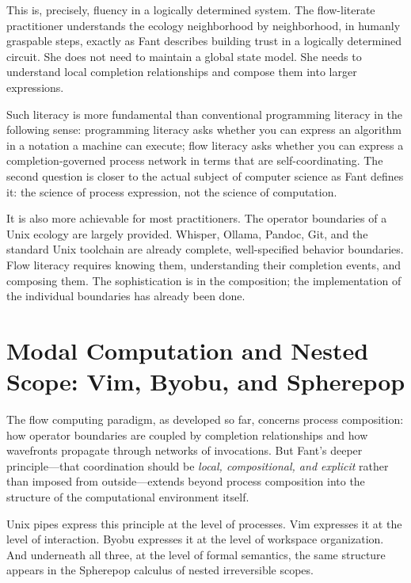 \documentclass[12pt, a4paper]{article}
\begin{document}
This is, precisely, fluency in a logically determined system. The
flow-literate practitioner understands the ecology neighborhood by
neighborhood, in humanly graspable steps, exactly as Fant describes
building trust in a logically determined circuit. She does not need
to maintain a global state model. She needs to understand local
completion relationships and compose them into larger expressions.

Such literacy is more fundamental than conventional programming
literacy in the following sense: programming literacy asks whether
you can express an algorithm in a notation a machine can execute;
flow literacy asks whether you can express a completion-governed
process network in terms that are self-coordinating. The second
question is closer to the actual subject of computer science as Fant
defines it: the science of process expression, not the science of
computation.

It is also more achievable for most practitioners. The operator
boundaries of a Unix ecology are largely provided. Whisper, Ollama,
Pandoc, Git, and the standard Unix toolchain are already complete,
well-specified behavior boundaries. Flow literacy requires knowing
them, understanding their completion events, and composing them.
The sophistication is in the composition; the implementation of the
individual boundaries has already been done.

\section{Modal Computation and Nested Scope: Vim, Byobu, and Spherepop}

The flow computing paradigm, as developed so far, concerns
process composition: how operator boundaries are coupled by
completion relationships and how wavefronts propagate through
networks of invocations. But Fant's deeper principle---that
coordination should be \emph{local, compositional, and explicit}
rather than imposed from outside---extends beyond process
composition into the structure of the computational environment
itself.

Unix pipes express this principle at the level of processes.
Vim expresses it at the level of interaction. Byobu expresses
it at the level of workspace organization. And underneath all
three, at the level of formal semantics, the same structure
appears in the Spherepop calculus of nested irreversible scopes.
\end{document}
